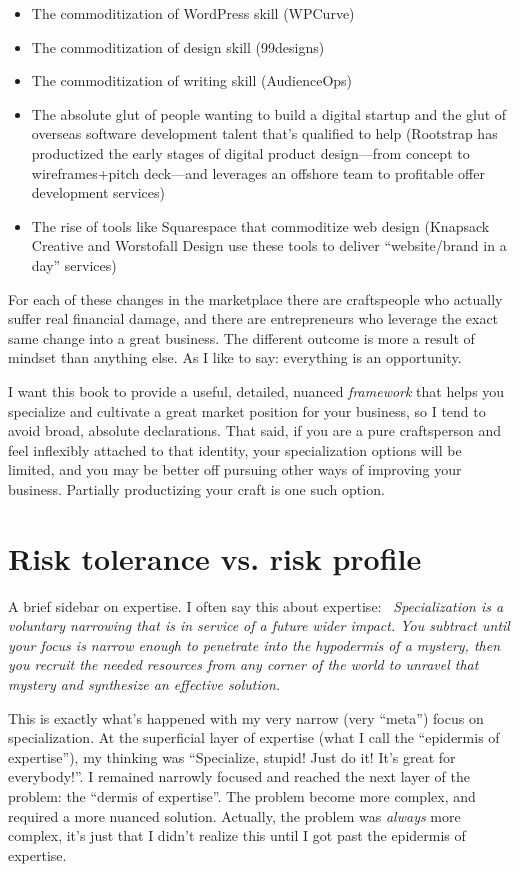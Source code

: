 \begin{itemize}
\item The commoditization of WordPress skill (WPCurve)
\item The commoditization of design skill (99designs)
\item The commoditization of writing skill (AudienceOps)
\item The absolute glut of people wanting to build a digital startup and the glut of overseas software development talent that's qualified to help (Rootstrap has productized the early stages of digital product design—from concept to wireframes+pitch deck—and leverages an offshore team to profitable offer development services)
\item The rise of tools like Squarespace that commoditize web design (Knapsack Creative and Worstofall Design use these tools to deliver “website/brand in a day” services)
\end{itemize}

For each of these changes in the marketplace there are craftspeople who actually suffer real financial damage, and there are entrepreneurs who leverage the exact same change into a great business. The different outcome is more a result of mindset than anything else. As I like to say: everything is an opportunity.

I want this book to provide a useful, detailed, nuanced \emph{framework} that helps you specialize and cultivate a great market position for your business, so I tend to avoid broad, absolute declarations. That said, if you are a pure craftsperson and feel inflexibly attached to that identity, your specialization options will be limited, and you may be better off pursuing other ways of improving your business. Partially productizing your craft is one such option.

\section{Risk tolerance vs. risk profile}

A brief sidebar on expertise. I often say this about expertise: \emph{ Specialization is a voluntary narrowing that is in service of a future wider impact. You subtract until your focus is narrow enough to penetrate into the hypodermis of a mystery, then you recruit the needed resources from any corner of the world to unravel that mystery and synthesize an effective solution.}

This is exactly what's happened with my very narrow (very ``meta'') focus on specialization. At the superficial layer of expertise (what I call the ``epidermis of expertise''), my thinking was ``Specialize, stupid! Just do it! It's great for everybody!''. I remained narrowly focused and reached the next layer of the problem: the ``dermis of expertise''. The problem become more complex, and required a more nuanced solution. Actually, the problem was \emph{always} more complex, it's just that I didn't realize this until I got past the epidermis of expertise.

